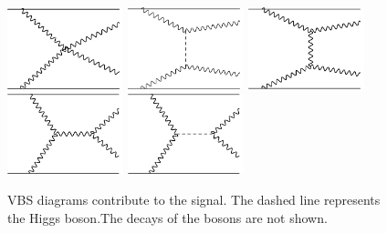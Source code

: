 \begin{figure}[tbp]
\begin{center}
 \includegraphics[width=0.3\textwidth,keepaspectratio]{figures/samples/feynVBS2.pdf}
 \includegraphics[width=0.3\textwidth,keepaspectratio]{figures/samples/feynVBS1.pdf}
 \includegraphics[width=0.3\textwidth,keepaspectratio]{figures/samples/feynVBS3.pdf}
 \includegraphics[width=0.3\textwidth,keepaspectratio]{figures/samples/feynVBS4.pdf}
 \includegraphics[width=0.3\textwidth,keepaspectratio]{figures/samples/feynVBS5.pdf}
\caption[f]{
VBS diagrams contribute to the signal.  
The dashed line represents the Higgs boson.The decays of the bosons are not shown.
}
\label{fig:feynmanVBS}
\end{center}
\end{figure}

